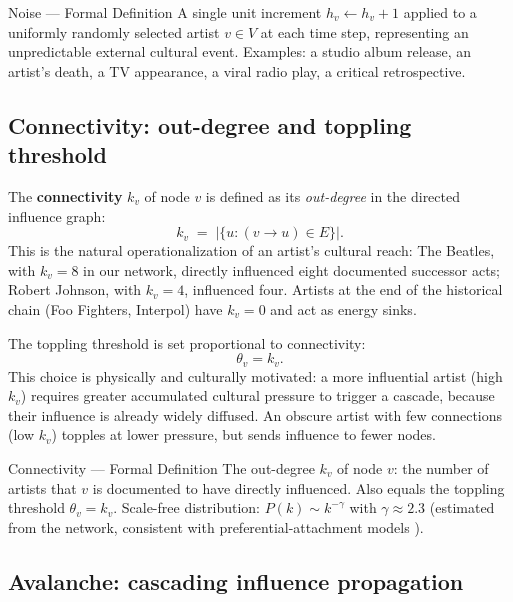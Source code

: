 \documentclass[12pt, a4paper]{article}
\begin{document}
\begin{definitionbox}{Noise --- Formal Definition}
A single unit increment $h_v \leftarrow h_v + 1$ applied to a
uniformly randomly selected artist $v\in V$ at each time step,
representing an unpredictable external cultural event.
Examples: a studio album release, an artist's death,
a TV appearance, a viral radio play, a critical retrospective.
\end{definitionbox}

\subsection{Connectivity: out-degree and toppling threshold}

The \textbf{connectivity} $k_v$ of node $v$ is defined as its
\textit{out-degree} in the directed influence graph:
\begin{equation}
  k_v \;=\; \bigl|\{u : (v\!\to\!u)\in E\}\bigr|.
  \label{eq:outdegree}
\end{equation}
This is the natural operationalization of an artist's cultural
reach: The Beatles, with $k_v=8$ in our network, directly
influenced eight documented successor acts; Robert Johnson,
with $k_v=4$, influenced four.
Artists at the end of the historical chain (Foo Fighters, Interpol)
have $k_v=0$ and act as energy sinks.

The toppling threshold is set proportional to connectivity:
\begin{equation}
  \theta_v = k_v.
  \label{eq:threshold}
\end{equation}
This choice is physically and culturally motivated: a more
influential artist (high $k_v$) requires greater accumulated
cultural pressure to trigger a cascade, because their
influence is already widely diffused.  An obscure artist
with few connections (low $k_v$) topples at lower pressure,
but sends influence to fewer nodes.

\begin{definitionbox}{Connectivity --- Formal Definition}
The out-degree $k_v$ of node $v$: the number of artists that
$v$ is documented to have directly influenced.
Also equals the toppling threshold $\theta_v = k_v$.
Scale-free distribution: $P(k)\sim k^{-\gamma}$ with
$\gamma\approx 2.3$ (estimated from the network, consistent
with preferential-attachment models \citep{barabasi1999}).
\end{definitionbox}

\subsection{Avalanche: cascading influence propagation}
\end{document}
